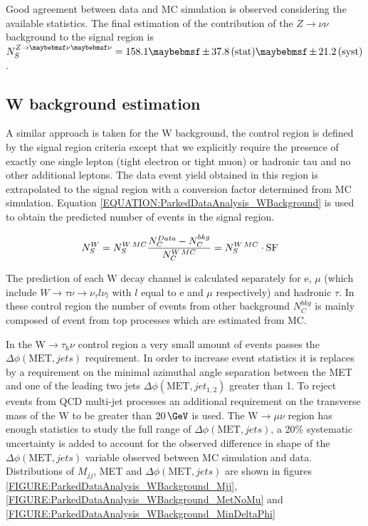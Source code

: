 Good agreement between data and \gls{MC} simulation is observed considering the available statistics. The final estimation of the contribution of the $Z\rightarrow \nu\nu$ background to the signal region is $N_{S}^{Z\rightarrow\nu\nu}= 158.1 \pm 37.8 \stat \pm 21.2 \syst$.

\subsection{W background estimation}
\label{SECTION:ParkedDataAnalysis_ControlRegions_WBackground}


A similar approach is taken for the W background, the control region is defined by the signal region criteria except that we explicitly require the presence of exactly one single lepton (tight electron or tight muon) or hadronic tau and no other additional leptons. The data event yield obtained in this region is extrapolated to the signal region with a conversion factor determined from \gls{MC} simulation. Equation \ref{EQUATION:ParkedDataAnalysis_WBackground} is used to obtain the predicted number of events in the signal region.

\begin{align}
N_{S}^{W}&=N_{S}^{W\,MC}\frac{N_{C}^{Data}-N_{C}^{bkg}}{N_{C}^{W\,MC}}=N_{S}^{W\,MC}\cdot \rm{SF}
\label{EQUATION:ParkedDataAnalysis_WBackground}
\end{align}

The prediction of each W decay channel is calculated separately for e, $\mu$ (which include $W\rightarrow\tau\nu\rightarrow \nu_\tau l\nu_l$ with $l$ equal to e and $\mu$ respectively) and hadronic $\tau$. In these control region the number of events from other background $N_{C}^{bkg}$ is mainly composed of event from top processes which are estimated from \gls{MC}.

In the W$\rightarrow\tau_{\mathrm{h}}\nu$ control region a very small amount of events passes the $\Delta\phi(\text{MET},jets)$ requirement. In order to increase event statistics it is replaces by a requirement on the minimal azimuthal angle separation between the \gls{MET} and one of the leading two jets $\Delta\phi(\text{MET},jet_{1,2})$ greater than 1. To reject events from \gls{QCD} multi-jet processes an additional requirement on the transverse mass of the W to be greater than $20\,\GeV$ is used. The W$\rightarrow\mu\nu$ region has enough statistics to study the full range of $\Delta\phi(\text{MET},jets)$, a 20\% systematic uncertainty is added to account for the observed difference in shape of the $\Delta\phi(\text{MET},jets)$ variable observed between \gls{MC} simulation and data. Distributions of $M_{jj}$, \gls{MET} and $\Delta\phi(\text{MET},jets)$ are shown in figures \ref{FIGURE:ParkedDataAnalysis_WBackground_Mjj}, \ref{FIGURE:ParkedDataAnalysis_WBackground_MetNoMu} and \ref{FIGURE:ParkedDataAnalysis_WBackground_MinDeltaPhi}


